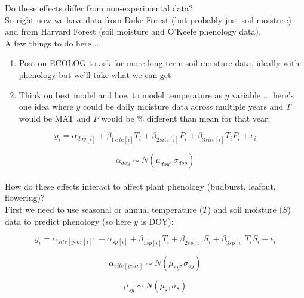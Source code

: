 \documentclass[12pt,a4paper]{article}
\begin{document}
 Do these effects differ from non-experimental data?\\

\noindent  So right now we have data from Duke Forest (but probably just soil moisture) and from Harvard Forest (soil moisture and O'Keefe phenology data).\\

\noindent A few things to do here ...
\begin{enumerate}
\item Post on ECOLOG to ask for more long-term soil moisture data, ideally with phenology but we'll take what we can get
\item Think on best model and how to model temperature as $y$ variable ... here's one idea where $y$ could be daily moisture data across multiple years and $T$ would be MAT and $P$ would be \% different than mean for that year:
\end{enumerate}

\begin{equation}
y_{i}=\alpha_{doy[i]}+\beta_{1 site[i]}T_i+\beta_{2 site[i]}P_i+\beta_{3 site[i]}T_iP_i+\epsilon_{i}
\end{equation}

\begin{equation}
\alpha_{doy} \sim N(\mu_{doy}, \sigma_{doy})
\end{equation}
\vspace{2ex}\\

 How do these effects interact to affect plant phenology (budburst, leafout, flowering)?\\

\noindent First we need to use seasonal or annual temperature ($T$) and soil moisture ($S$) data to predict phenology (so here $y$ is DOY):

\begin{equation}
y_{i}=\alpha_{site[year[i]]}+ \alpha_{sp[i]}+\beta_{1 sp[i]}T_i+\beta_{2 sp[i]}S_i+\beta_{3 sp[i]}T_iS_i+\epsilon_{i}
\end{equation}

\begin{equation}
\alpha_{site[year]} \sim N(\mu_{sy}, \sigma_{sy})
\end{equation}

\begin{equation}
\mu_{sy} \sim N(\mu_{s}, \sigma_{s})
\end{equation}
\end{document}
